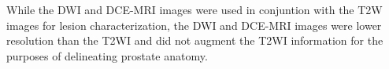 While the DWI and DCE-MRI images were used in conjuntion with the T2W images
for lesion characterization, the DWI and DCE-MRI images were lower resolution
than the T2WI and did not augment the T2WI information for the purposes of
delineating prostate anatomy.
